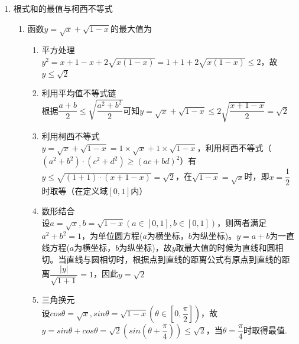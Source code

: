 \begin{enumerate}
\begin{enumerate}
\begin{jieda}
\begin{enumerate}
                \item 根据$f(c) = 0$可知$1+b+ac = 0$，因此不等式变为$m^2-2km \geq 0$，
                以$k$为主元，设$g(k) = m^2 - 2km$，则应有$g(-1) \geq 0, g(1) \geq 0$，解得$m \in (-\infty, -2] \cup [2, +\infty) \cup \{0\}$
            \end{enumerate}
        \end{jieda}
    \end{enumerate}
    \item 根式和的最值与柯西不等式
    \begin{enumerate}
        \item 函数$y = \sqrt{x} + \sqrt{1-x}$的最大值为
        \begin{jieda}
            \begin{enumerate}
            \item 平方处理 \\
            $y^2 = x + 1 - x + 2\sqrt{x(1-x)} = 1 + 1 + 2\sqrt{x(1-x)} \leq 2$，故$y \leq \sqrt{2}$
            \item 利用平均值不等式链 \\
            根据$\dfrac{a+b}{2} \leq \sqrt{\dfrac{a^2+b^2}{2}}$可知$y = \sqrt{x} + \sqrt{1-x} \leq 2\sqrt{\dfrac{x + 1 - x}{2}} = \sqrt{2}$
            \item 利用柯西不等式 \\
            $y = \sqrt{x} + \sqrt{1-x} = 1 \times \sqrt{x} + 1 \times \sqrt{1-x}$，利用柯西不等式（$(a^2+b^2)\cdot(c^2+d^2) \geq (ac+bd)^2$）有$y \leq \sqrt{(1+1) \cdot (x + 1-x)} = \sqrt{2}$，在$\sqrt{1-x} = \sqrt{x}$时，即$x = \dfrac{1}{2}$时取等（在定义域$[0,1]$内）
            \item 数形结合 \\
            设$a = \sqrt{x}, b = \sqrt{1-x} (a \in [0, 1], b \in [0, 1])$，则两者满足$a^2 + b^2 = 1$，为单位圆方程($a$为横坐标，$b$为纵坐标)。$y = a+b$为一直线方程($a$为横坐标，$b$为纵坐标)，故$y$取最大值的时候为直线和圆相切。当直线与圆相切时，根据点到直线的距离公式有原点到直线的距离$\dfrac{|y|}{\sqrt{1+1}} = 1$，因此$y = \sqrt{2}$
            \item 三角换元 \\
            设$cos\theta = \sqrt{x}, sin\theta = \sqrt{1-x} \left(\theta \in \left[0, \dfrac{\pi}{2}\right]\right)$，故$y = sin \theta + cos\theta = \sqrt{2}\left(sin\left(\theta + \dfrac{\pi}{4}\right)\right) \leq \sqrt{2}$，当$\theta = \dfrac{\pi}{4}$时取得最值.
        \end{enumerate}        
        \end{jieda}

\end{enumerate}
\end{enumerate}
